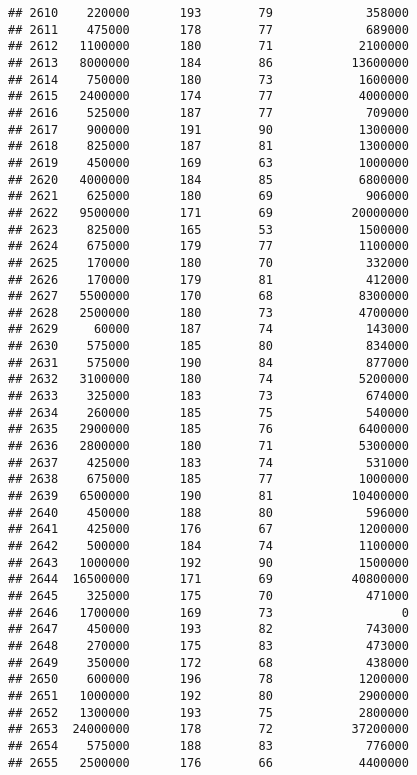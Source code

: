 \documentclass[
]{article}
\begin{document}
\begin{verbatim}
## 2610    220000       193        79             358000
## 2611    475000       178        77             689000
## 2612   1100000       180        71            2100000
## 2613   8000000       184        86           13600000
## 2614    750000       180        73            1600000
## 2615   2400000       174        77            4000000
## 2616    525000       187        77             709000
## 2617    900000       191        90            1300000
## 2618    825000       187        81            1300000
## 2619    450000       169        63            1000000
## 2620   4000000       184        85            6800000
## 2621    625000       180        69             906000
## 2622   9500000       171        69           20000000
## 2623    825000       165        53            1500000
## 2624    675000       179        77            1100000
## 2625    170000       180        70             332000
## 2626    170000       179        81             412000
## 2627   5500000       170        68            8300000
## 2628   2500000       180        73            4700000
## 2629     60000       187        74             143000
## 2630    575000       185        80             834000
## 2631    575000       190        84             877000
## 2632   3100000       180        74            5200000
## 2633    325000       183        73             674000
## 2634    260000       185        75             540000
## 2635   2900000       185        76            6400000
## 2636   2800000       180        71            5300000
## 2637    425000       183        74             531000
## 2638    675000       185        77            1000000
## 2639   6500000       190        81           10400000
## 2640    450000       188        80             596000
## 2641    425000       176        67            1200000
## 2642    500000       184        74            1100000
## 2643   1000000       192        90            1500000
## 2644  16500000       171        69           40800000
## 2645    325000       175        70             471000
## 2646   1700000       169        73                  0
## 2647    450000       193        82             743000
## 2648    270000       175        83             473000
## 2649    350000       172        68             438000
## 2650    600000       196        78            1200000
## 2651   1000000       192        80            2900000
## 2652   1300000       193        75            2800000
## 2653  24000000       178        72           37200000
## 2654    575000       188        83             776000
## 2655   2500000       176        66            4400000

\end{verbatim}
\end{document}
